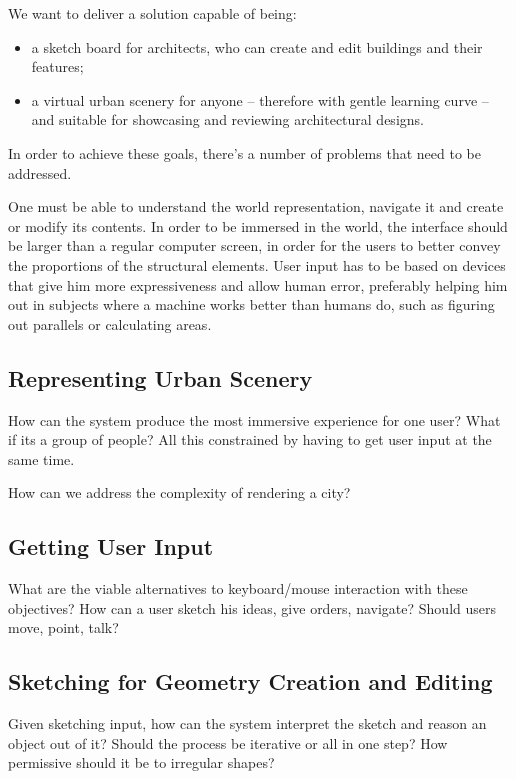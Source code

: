 
We want to deliver a solution capable of being:
\begin{itemize}
	\item a sketch board for architects, who can create and edit buildings and their features;
	\item a virtual urban scenery for anyone -- therefore with gentle learning curve -- and suitable for showcasing and reviewing architectural designs.
\end{itemize}
In order to achieve these goals, there's a number of problems that need to be addressed.

One must be able to understand the world representation, navigate it and create or modify its contents.
In order to be immersed in the world, the interface should be larger than a regular computer screen,
in order for the users to better convey the proportions of the structural elements.
User input has to be based on devices that give him more expressiveness and allow human error,
preferably helping him out in subjects where a machine works better than humans do, such as figuring
out parallels or calculating areas.


\subsection{Representing Urban Scenery}
How can the system produce the most immersive experience for one user?
What if its a group of people? All this constrained by having to get user input at the same time.

How can we address the complexity of rendering a city?


\subsection{Getting User Input}
What are the viable alternatives to keyboard/mouse interaction with these objectives?
How can a user sketch his ideas, give orders, navigate? Should users move, point, talk?


\subsection{Sketching for Geometry Creation and Editing}
Given sketching input, how can the system interpret the sketch and reason an object
out of it? Should the process be iterative or all in one step? How permissive should
it be to irregular shapes?
 

